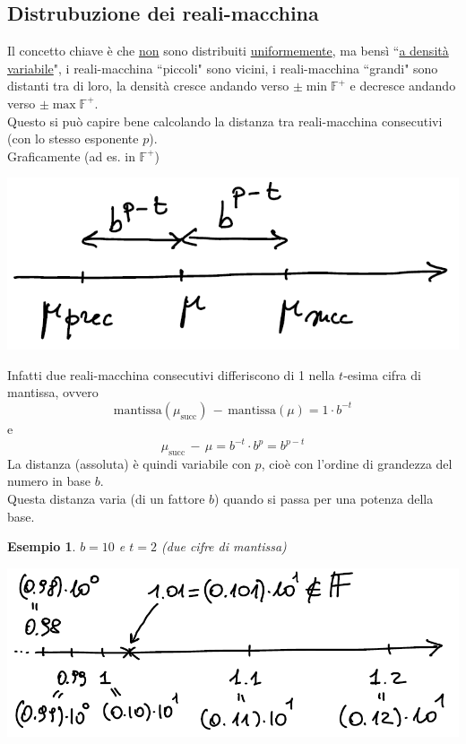 \documentclass[12pt]{article}
\newtheorem*{esempio}{Esempio}
\begin{document}
\subsection{Distrubuzione dei reali-macchina}
Il concetto chiave è che \uline{non} sono distribuiti \uline{uniformemente}, ma bensì ``\uline{a densità variabile}", i reali-macchina ``piccoli" sono vicini, i reali-macchina ``grandi" sono distanti tra di loro, la densità cresce andando verso $\pm \min \mathbb{F}^+$ e decresce andando verso $\pm \max \mathbb{F}^+$. \\
Questo si può capire bene calcolando la distanza tra reali-macchina consecutivi (con lo stesso esponente $p$).\\
Graficamente (ad es. in $\mathbb{F}^+$) 
\begin{center}
    \includegraphics[scale=0.65]{img5.png}
\end{center}
Infatti due reali-macchina consecutivi differiscono di 1 nella $t$-esima cifra di mantissa, ovvero
\[ \text{mantissa}(\mu_{\text{succ}})\,-\,\text{mantissa}(\mu) = 1 \cdot b^{-t}\] e 
\[ \mu_{\text{succ}}\,-\,\mu = b^{-t} \cdot b^p = b^{p-t} \]
La distanza (assoluta) è quindi variabile con $p$, cioè con l'ordine di grandezza del numero in base $b$. \\
Questa distanza varia (di un fattore $b$) quando si passa per una potenza della base.
\begin{esempio}
$b = 10$ e $t = 2$ (due cifre di mantissa) 
\begin{center}
    \includegraphics[scale=0.65]{img6.png}
\end{center}
\end{esempio}
\end{document}
